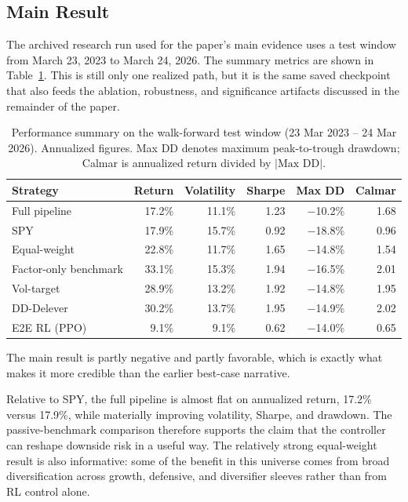 \documentclass[10pt,twocolumn]{article}
\begin{document}
\subsection{Main Result}

The archived research run used for the paper's main evidence uses a test window
from March 23, 2023 to March 24, 2026. The summary metrics are shown in
Table~\ref{tab:metrics}. This is still only one realized path, but it is the
same saved checkpoint that also feeds the ablation, robustness, and significance
artifacts discussed in the remainder of the paper.

\begin{table}[t]
\centering
\small
\caption{Performance summary on the walk-forward test window
  (23 Mar 2023 -- 24 Mar 2026). Annualized figures. Max DD denotes maximum
  peak-to-trough drawdown; Calmar is annualized return divided by $|\text{Max DD}|$.}
\label{tab:metrics}
\begin{tabular}{@{} l r r r r r @{}}
\toprule
\textbf{Strategy} & \textbf{Return} & \textbf{Volatility} & \textbf{Sharpe} & \textbf{Max DD} & \textbf{Calmar} \\
\midrule
Full pipeline            & 17.2\% & 11.1\% & 1.23 & $-$10.2\% & 1.68 \\
SPY                      & 17.9\% & 15.7\% & 0.92 & $-$18.8\% & 0.96 \\
Equal-weight            & 22.8\% & 11.7\% & 1.65 & $-$14.8\% & 1.54 \\
Factor-only benchmark    & 33.1\% & 15.3\% & 1.94 & $-$16.5\% & 2.01 \\
Vol-target               & 28.9\% & 13.2\% & 1.92 & $-$14.8\% & 1.95 \\
DD-Delever               & 30.2\% & 13.7\% & 1.95 & $-$14.9\% & 2.02 \\
E2E RL (PPO)             & 9.1\% & 9.1\% & 0.62 & $-$14.0\% & 0.65 \\
\bottomrule
\end{tabular}
\end{table}

The main result is partly negative and partly favorable, which is exactly what
makes it more credible than the earlier best-case narrative.

Relative to SPY, the full pipeline is almost flat on annualized return, 17.2\%
versus 17.9\%, while materially improving volatility, Sharpe, and drawdown. The
passive-benchmark comparison therefore supports the claim that the controller
can reshape downside risk in a useful way.
The relatively strong equal-weight result is also informative: some of the
benefit in this universe comes from broad diversification across growth,
defensive, and diversifier sleeves rather than from RL control alone.
\end{document}
